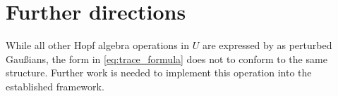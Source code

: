 \documentclass{article}
\begin{document}
\section{Further directions}
While all other Hopf algebra operations in $U$ are expressed by \cite{BV} as
perturbed Gaußians, the form in \cref{eq:trace_formula} does not to conform to
the same structure. Further work is needed to implement this operation into the
established framework.

\printbibliography
\end{document}
